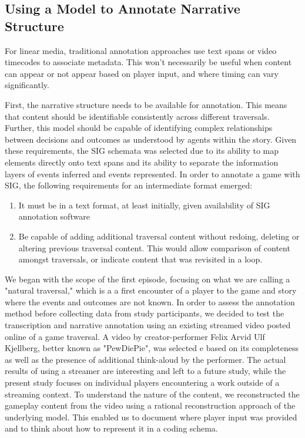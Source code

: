 \subsection{Using a Model to Annotate Narrative Structure}
\label{sec:orgheadline5}
For linear media, traditional annotation approaches use text spans or
video timecodes to associate metadata. This won't necessarily be
useful when content can appear or not appear based on player input,
and where timing can vary significantly.

First, the narrative structure needs to be available for
annotation. This means that content should be identifiable
consistently across different traversals. Further, this model should
be capable of identifying complex relationships between decisions and
outcomes as understood by agents within the story. Given these
requirements, the SIG schemata was selected due to its ability to map
elements directly onto text spans and its ability to separate the
information layers of events inferred and events represented. In order
to annotate a game with SIG, the following requirements for an
intermediate format emerged:

\begin{enumerate}
\item It must be in a text format, at least initially, given
availability of SIG annotation software
\item Be capable of adding additional traversal content without
redoing, deleting or altering previous traversal content. This
would allow comparison of content amongst traversals, or indicate
content that was revisited in a loop.
\end{enumerate}

We began with the scope of the first episode, focusing on what we are
calling a "natural traversal," which is a a first encounter of a
player to the game and story where the events and outcomes are not
known. In order to assess the annotation method before collecting data
from study participants, we decided to test the transcription and
narrative annotation using an existing streamed video posted online of
a game traversal. A video by creator-performer Felix Arvid Ulf
Kjellberg, better known as "PewDiePie", was selected
\cite{Kjellberg2013-fn}e based on its completeness as well as the
presence of additional think-aloud by the performer. The actual
results of using a streamer are interesting and left to a future
study, while the present study focuses on individual players
encountering a work outside of a streaming context. To understand the
nature of the content, we reconstructed the gameplay content from the
video using a rational reconstruction approach of the underlying
model. This enabled us to document where player input was provided and
to think about how to represent it in a coding schema. 

